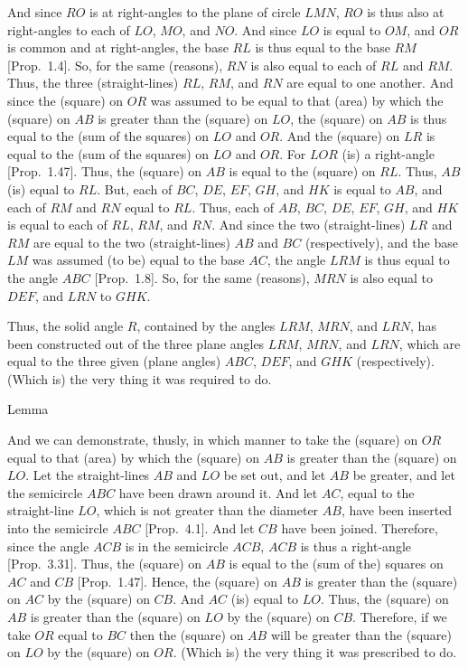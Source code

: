 And since $RO$ is at right-angles to the plane of circle $LMN$, $RO$
is thus also at right-angles to each of $LO$, $MO$, and $NO$. And since
$LO$ is equal to $OM$, and $OR$ is common and at right-angles,
the base $RL$ is thus equal to the base $RM$ [Prop.~1.4]. So, for the same (reasons), $RN$ is also equal to
each of $RL$ and $RM$. Thus, the three (straight-lines) $RL$, $RM$,
and $RN$ are equal to one another. And since the (square) on $OR$
was assumed to be equal to that (area) by which the (square) on $AB$
is greater than the (square) on $LO$, the (square) on $AB$ is thus equal
to the (sum of the squares) on $LO$ and $OR$. And the (square) on 
$LR$ is equal to the (sum of the squares) on $LO$ and $OR$. For $LOR$ (is) a right-angle  [Prop.~1.47]. Thus,
the (square) on $AB$ is equal to the (square) on $RL$. Thus, $AB$ (is)
equal to $RL$. But, each of $BC$, $DE$, $EF$, $GH$, and $HK$
is equal to $AB$, and each of $RM$ and $RN$ equal to $RL$. Thus,
each of $AB$, $BC$, $DE$, $EF$, $GH$, and $HK$ is equal to each of
$RL$, $RM$, and $RN$. And since the two (straight-lines)
$LR$ and $RM$ are equal to the two (straight-lines) $AB$ and $BC$ (respectively), and the base $LM$ was assumed (to be) equal to the
base $AC$, the angle $LRM$ is thus equal to the angle $ABC$
[Prop.~1.8]. So, for the same (reasons), $MRN$
is also equal to $DEF$, and $LRN$ to $GHK$.

Thus, the solid angle $R$, contained by the angles $LRM$, $MRN$, and $LRN$,  has been constructed out of the three plane
angles $LRM$, $MRN$, and $LRN$, which are equal to the three
given (plane angles) $ABC$, $DEF$, and $GHK$ (respectively). 
(Which is) the very thing it was required to do.~\\



\epsfysize=1.2in
\centerline{}

\begin{center}
{\large Lemma}
\end{center}\vspace*{-7pt}

And we can demonstrate, thusly,  in which manner to take the (square) on $OR$ equal to that (area) by which
the (square) on $AB$ is greater than the (square) on $LO$. Let the straight-lines $AB$ and $LO$ be set out, and let $AB$ be greater, and let the semicircle $ABC$ have been drawn around it.  And
let $AC$, equal to the  straight-line $LO$, which is not greater than the diameter $AB$,  have been inserted into the semicircle $ABC$ [Prop.~4.1]. And let $CB$ have been joined. Therefore, since
the angle  $ACB$ is in the semicircle $ACB$, $ACB$ is thus a right-angle
[Prop.~3.31]. Thus, the (square) on $AB$
is  equal to the (sum of the) squares on $AC$ and $CB$ [Prop.~1.47]. Hence, the (square) on $AB$ is greater than the
(square) on $AC$ by the (square) on $CB$. And $AC$ (is) equal to $LO$.
Thus, the (square) on $AB$ is greater than the
(square) on $LO$ by the (square) on $CB$. Therefore, if we take
$OR$ equal to $BC$ then the (square) on $AB$ will be greater than the
(square) on $LO$ by the (square) on $OR$. (Which is) the very thing
it was prescribed to do.

